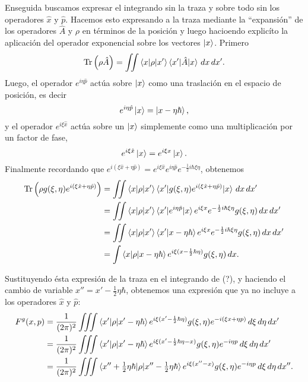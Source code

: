 \documentclass[a4paper]{report}
\DeclareMathOperator{\Tr}{Tr}
\begin{document}
  Enseguida buscamos expresar el integrando sin la traza y
  sobre todo sin los operadores $\hat{x}$ y $\hat{p}$.
  Hacemos esto expresando a la traza mediante la
  ``expansión'' de los operadores $\hat{A}$ y $\rho$ en
  términos de la posición y luego hacioendo explicíto la
  aplicación del operador exponencial sobre los vectores
  $\ket x$. Primero
  \begin{equation}
    \Tr\left( \rho \hat{A} \right) 
    = \iint \braket{x|\rho|x'} \braket{x'|\hat{A}|x} \, dx
    \, dx'.
  \end{equation}
  Luego, el operador $e^{i\eta \hat{p}}$ actúa sobre $\ket
  x$ como una traslación en el espacio de posición, es decir
  \[
    e^{i\eta \hat{p}} \ket x
    = \ket{x - \eta \hbar},
  \] 
  y el operador $e^{i\xi \hat{x}}$ actúa sobre un $\ket x$ 
  simplemente como una multiplicación por un factor de fase,
  \[
    e^{i\xi \hat{x}} \ket x
    = e^{i\xi x} \ket x.
  \] 
  Finalmente recordando que $e^{i(\xi \hat{x} + \eta
  \hat{p})} = e^{i \xi \hat{x}} e^{i \eta \hat{p}}
  e^{-\frac{1}{2}i\hbar \xi \eta}$, obtenemos
  \begin{align*}
    \Tr\left( \rho g(\xi,\eta)e^{i(\xi \hat{x} + \eta
    \hat{p})} \right) 
    &= \iint \braket{x|\rho|x'} \braket{x'|g(\xi,\eta)
      e^{i(\xi \hat{x} + \eta \hat{p})}|x} \, dx \, dx' \\
    &= \iint \braket{x|\rho|x'} \braket{x'|e^{i\eta
      \hat{p}}|x} e^{i\xi x}e^{-\frac{1}{2} i \hbar \xi \eta}
      g(\xi,\eta) \, dx \, dx' \\
    &=  \iint \braket{x|\rho|x'} \braket{x'|x - \eta \hbar}
    e^{i\xi x}e^{-\frac{1}{2} i \hbar \xi \eta} g(\xi,\eta)
    \, dx \, dx' \\
    &= \int \braket{x|\rho|x - \eta \hbar} e^{i\xi (x
    -\frac{1}{2} \hbar \eta)}g(\xi,\eta) \, dx.
  \end{align*}

  Sustituyendo ésta expresión de la traza en el integrando
  de (?), y haciendo el cambio de variable $x'' = x' -
  \frac{1}{2}\eta\hbar$, obtenemos una expresión que ya no
  incluye a los operadores $\hat{x}$ y $\hat{p}$:
  \begin{align*}
    F^{g}(x,p)
    &= \frac{1}{(2\pi)^2} \iiint \braket{x'|\rho|x' -
    \eta\hbar} e^{i\xi(x' - \frac{1}{2}\hbar \eta)}
    g(\xi,\eta) e^{-i(\xi x + \eta p)} \, d\xi \, d\eta \,
    dx'\\
    &= \frac{1}{(2\pi)^2}\iiint \braket{x'|\rho|x'-\eta
    \hbar} e^{i\xi(x' - \frac{1}{2}\hbar\eta - x)}
    g(\xi,\eta) e^{-i\eta p} \, d\xi \, d\eta \, dx' \\
    &= \frac{1}{(2\pi)^2}\iiint \braket{x'' + \tfrac{1}{2}
    \eta \hbar|\rho|x'' - \tfrac{1}{2} \eta \hbar}
    e^{i\xi(x'' - x)} g(\xi,\eta) e^{-i\eta p} \, d\xi \,
    d\eta \, dx''.
  \end{align*}
\end{document}
